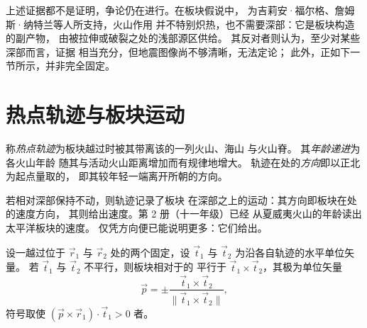 上述证据都不是证明，争论仍在进行。在板块假说中，
为吉莉安·福尔格、詹姆斯·纳特兰等人所支持，火山作用
并不特别炽热，也不需要深部：它是板块构造的副产物，
由被拉伸或破裂之处的浅部源区供给。
其反对者则认为，至少对某些深部而言，证据
相当充分，但地震图像尚不够清晰，无法定论；
此外，正如下一节所示，并非完全固定。

\section{热点轨迹与板块运动}\label{sec:b1:hotspots:tracks}

\begin{definition}\label{def:b1:hotspots:track}
称\emph{热点轨迹}为板块越过时被其带离该的一列火山、海山
与火山脊。
其\emph{年龄递进}为各火山年龄
随其与活动火山距离增加而有规律地增大。
轨迹在处的\emph{方向}即以正北为起点量取的，
即其较年轻一端离开所朝的方向。
\end{definition}

若相对深部保持不动，则轨迹记录了板块
在深部之上的运动：其方向即板块在处的速度方向，
其则给出速度。第 2 册（十一年级）已经
从夏威夷火山的年龄读出太平洋板块的速度。
仅凭方向便已能说明更多：它们给出。

\begin{proposition}[由两条轨迹确定欧拉极]\label{prop:b1:hotspots:two-tracks}
设一越过位于 $\vec r_1$ 与
$\vec r_2$ 处的两个固定，设 $\vec t_1$ 与 $\vec t_2$ 为沿各自轨迹的水平单位矢量。
若 $\vec t_1$ 与 $\vec t_2$ 不平行，则板块相对于的
平行于
$\vec t_1\times\vec t_2$，其极为单位矢量
\[
  \vec p = \pm\frac{\vec t_1\times\vec t_2}{\lVert\vec t_1\times\vec t_2\rVert},
\]
符号取使 $(\vec p\times\vec r_1)\cdot\vec t_1 > 0$ 者。
\end{proposition}

